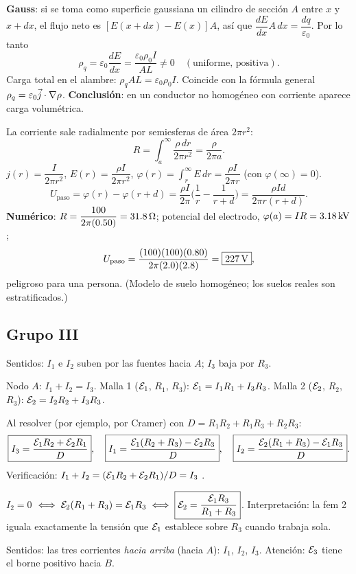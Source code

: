 \textbf{Gauss}: si se toma como superficie gaussiana un cilindro de sección $A$ entre $x$ y $x+dx$, el flujo neto es $[E(x+dx)-E(x)]A$, así que $\dfrac{dE}{dx}A\,dx=\dfrac{dq}{\varepsilon_0}$. Por lo tanto
\[
\rho_q=\varepsilon_0\frac{dE}{dx}=\boxed{\frac{\varepsilon_0\rho_0I}{AL}}\neq0\quad(\text{uniforme, positiva}).
\]
Carga total en el alambre: $\rho_qAL=\varepsilon_0\rho_0I$. Coincide con la fórmula general $\rho_q=\varepsilon_0\vj\cdot\nabla\rho$. \textbf{Conclusión}: en un conductor no homogéneo con corriente aparece carga volumétrica.

La corriente sale radialmente por semiesferas de área $2\pi r^2$:
\[
R=\int_a^\infty\frac{\rho\,dr}{2\pi r^2}=\boxed{\frac{\rho}{2\pi a}}.
\]
$j(r)=\dfrac{I}{2\pi r^2}$, $E(r)=\dfrac{\rho I}{2\pi r^2}$, $\varphi(r)=\displaystyle\int_r^\infty E\,dr=\dfrac{\rho I}{2\pi r}$ (con $\varphi(\infty)=0$).
\[
U_{\text{paso}}=\varphi(r)-\varphi(r+d)=\frac{\rho I}{2\pi}\Big(\frac1r-\frac1{r+d}\Big)=\boxed{\frac{\rho Id}{2\pi r(r+d)}}.
\]
\textbf{Numérico}: $R=\dfrac{100}{2\pi(0.50)}=31.8\ohm$; potencial del electrodo, $\varphi(a)=IR=3.18\uu{kV}$;
\[
U_{\text{paso}}=\frac{(100)(100)(0.80)}{2\pi(2.0)(2.8)}=\boxed{227\uu V},
\]
peligroso para una persona. (Modelo de suelo homogéneo; los suelos reales son estratificados.)

\subsection*{Grupo III}
Sentidos: $I_1$ e $I_2$ suben por las fuentes hacia $A$; $I_3$ baja por $R_3$.

Nodo $A$: $I_1+I_2=I_3$. Malla 1 ($\fem_1$, $R_1$, $R_3$): $\fem_1=I_1R_1+I_3R_3$. Malla 2 ($\fem_2$, $R_2$, $R_3$): $\fem_2=I_2R_2+I_3R_3$.

Al resolver (por ejemplo, por Cramer) con $D=R_1R_2+R_1R_3+R_2R_3$:
\[
\boxed{I_3=\frac{\fem_1R_2+\fem_2R_1}{D}},\quad\boxed{I_1=\frac{\fem_1(R_2+R_3)-\fem_2R_3}{D}},\quad\boxed{I_2=\frac{\fem_2(R_1+R_3)-\fem_1R_3}{D}}.
\]
Verificación: $I_1+I_2=(\fem_1R_2+\fem_2R_1)/D=I_3$ \checkmark.

\textbf{$I_2=0$} $\iff\fem_2(R_1+R_3)=\fem_1R_3\iff\boxed{\fem_2=\dfrac{\fem_1R_3}{R_1+R_3}}$. Interpretación: la fem 2 iguala exactamente la tensión que $\fem_1$ establece sobre $R_3$ cuando trabaja sola.

\begin{center}\circSdosQdoce\end{center}
Sentidos: las tres corrientes \emph{hacia arriba} (hacia $A$): $I_1$, $I_2$, $I_3$. Atención: $\fem_3$ tiene el borne positivo hacia $B$.

